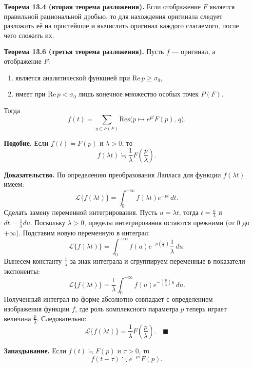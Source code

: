 \documentclass[12pt, a4paper]{article}
\theoremstyle{definition}
\theoremstyle{remark}
\begin{document}
\vspace{1em}

\textbf{Теорема 13.4 (вторая теорема разложения).} Если отображение $F$ является правильной рациональной дробью, то для нахождения оригинала следует разложить её на простейшие и вычислить оригинал каждого слагаемого, после чего сложить их.

\vspace{1em}

\textbf{Теорема 13.6 (третья теорема разложения).} Пусть $f$ --- оригинал, а отображение $F$:
\begin{enumerate}
	\item является аналитической функцией при $\text{Re} \, p \ge \sigma_0$,
	\item имеет при $\text{Re} \, p < \sigma_0$ лишь конечное множество особых точек $P(F)$.
\end{enumerate}
Тогда
\begin{equation}
	f(t) = \sum_{q \in P(F)} \text{Res}\Big( p \mapsto e^{pt}F(p), \, q \Big).
\end{equation}

\textbf{Подобие.} Если $f(t) \fallingdotseq F(p)$ и $\lambda > 0$, то
$$f(\lambda t) \fallingdotseq \frac{1}{\lambda} F\left(\frac{p}{\lambda}\right).$$

\textbf{Доказательство.} По определению преобразования Лапласа для функции $f(\lambda t)$ имеем:
$$\mathcal{L}\{f(\lambda t)\} = \int_{0}^{+\infty} f(\lambda t) e^{-pt} \, dt.$$
Сделать замену переменной интегрирования. Пусть $u = \lambda t$, тогда $t = \frac{u}{\lambda}$ и $dt = \frac{1}{\lambda} du$. Поскольку $\lambda > 0$, пределы интегрирования остаются прежними (от $0$ до $+\infty$). Подставим новую переменную в интеграл:
$$\mathcal{L}\{f(\lambda t)\} = \int_{0}^{+\infty} f(u) e^{-p \left(\frac{u}{\lambda}\right)} \frac{1}{\lambda} \, du.$$
Вынесем константу $\frac{1}{\lambda}$ за знак интеграла и сгруппируем переменные в показатели экспоненты:
$$\mathcal{L}\{f(\lambda t)\} = \frac{1}{\lambda} \int_{0}^{+\infty} f(u) e^{-\left(\frac{p}{\lambda}\right) u} \, du.$$
Полученный интеграл по форме абсолютно совпадает с определением изображения функции $f$, где роль комплексного параметра $p$ теперь играет величина $\frac{p}{\lambda}$. Следовательно:
$$\mathcal{L}\{f(\lambda t)\} = \frac{1}{\lambda} F\left(\frac{p}{\lambda}\right). \quad \blacksquare$$

\textbf{Запаздывание.} Если $f(t) \fallingdotseq F(p)$ и $\tau > 0$, то
$$f(t - \tau) \fallingdotseq e^{-p\tau} F(p).$$
\end{document}
